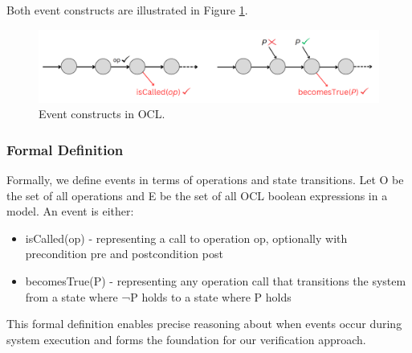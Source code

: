 Both event constructs are illustrated in Figure \ref{fig:event_constructs}.

\begin{figure}
    \centering
    \includegraphics[width=1\textwidth]{figures/c2/events_visual.png}
    \caption{Event constructs in OCL.}
    \label{fig:event_constructs}
\end{figure}


\subsubsection{Formal Definition}

Formally, we define events in terms of operations and state transitions. Let O be the set of all operations and E be the set of all OCL boolean expressions in a model. An event is either:

\begin{itemize}
    \item isCalled(op) - representing a call to operation op, optionally with precondition pre and postcondition post
    \item becomesTrue(P) - representing any operation call that transitions the system from a state where ¬P holds to a state where P holds
\end{itemize}

This formal definition enables precise reasoning about when events occur during system execution and forms the foundation for our verification approach.



